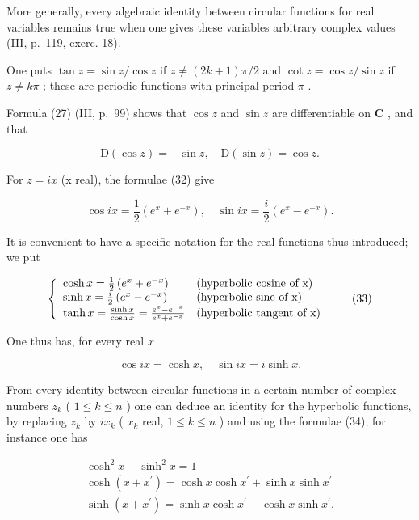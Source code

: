 More generally, every algebraic identity between circular functions for real variables remains true when one gives these variables arbitrary complex values (III, p.~119, exerc. 18).

One puts \(\tan z = \sin z/\cos z\) if \(z \neq (2k + 1)\pi/2\) and \(\cot z = \cos z/\sin z\) if \(z \neq k\pi\) ; these are periodic functions with principal period \(\pi\) .

Formula (27) (III, p.~99) shows that \(\cos z\) and \(\sin z\) are differentiable on \(\mathbf{C}\) , and that

\[
\mathrm{D} (\cos z) = - \sin z, \quad \mathrm{D} (\sin z) = \cos z.
\]

For \(z = ix\) (x real), the formulae (32) give

\[
\cos i x = \frac {1}{2} \left(e ^ {x} + e ^ {- x}\right), \quad \sin i x = \frac {i}{2} \left(e ^ {x} - e ^ {- x}\right).
\]

It is convenient to have a specific notation for the real functions thus introduced; we put

\[
\left\{ \begin{array}{l l} \cosh x = \frac {1}{2} \left(e ^ {x} + e ^ {- x}\right) & \text {(hyperbolic cosine of x)} \\ \sinh x = \frac {i}{2} \left(e ^ {x} - e ^ {- x}\right) & \text {(hyperbolic sine of x)} \\ \tanh x = \frac {\sinh x}{\cosh x} = \frac {e ^ {x} - e ^ {- x}}{e ^ {x} + e ^ {- x}} & \text {(hyperbolic tangent of x)} \end{array} \right.\tag{33}
\]

One thus has, for every real \(x\)

\[
\cos i x = \cosh x, \quad \sin i x = i \sinh x.\tag{34}
\]

From every identity between circular functions in a certain number of complex numbers \(z_{k}\) ( \(1 \leqslant k \leqslant n\) ) one can deduce an identity for the hyperbolic functions, by replacing \(z_{k}\) by \(ix_{k}\) ( \(x_{k}\) real, \(1 \leqslant k \leqslant n\) ) and using the formulae (34); for instance one has

\[
\begin{array}{c} \cosh^ {2} x - \sinh^ {2} x = 1 \\ \cosh (x + x ^ {\prime}) = \cosh x \cosh x ^ {\prime} + \sinh x \sinh x ^ {\prime} \\ \sinh (x + x ^ {\prime}) = \sinh x \cosh x ^ {\prime} - \cosh x \sinh x ^ {\prime}. \end{array}
\]

